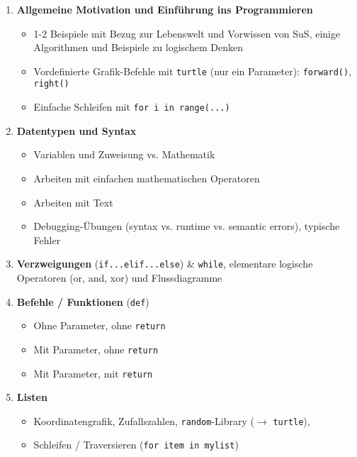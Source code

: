 \begin{overviewBox}[title=Überblick der Themen]
    \begin{enumerate}
    \item \textbf{Allgemeine Motivation und Einführung ins Programmieren}
    \begin{itemize}
        \item 1-2 Beispiele mit Bezug zur Lebenswelt und Vorwissen von SuS, einige Algorithmen und Beispiele zu logischem Denken
        \item Vordefinierte Grafik-Befehle mit \lstinline|turtle| (nur ein Parameter): \lstinline|forward()|, \lstinline|right()|
        \item Einfache Schleifen mit \lstinline|for i in range(...)|
    \end{itemize}
    \item \textbf{Datentypen und Syntax}
    \begin{itemize}
        \item Variablen und Zuweisung vs. Mathematik
        \item Arbeiten mit einfachen mathematischen Operatoren
        \item Arbeiten mit Text
        \item Debugging-Übungen (syntax vs. runtime vs. semantic errors), typische Fehler
    \end{itemize}
    \item \textbf{Verzweigungen} (\lstinline|if...elif...else|) \& \lstinline|while|,  elementare logische Operatoren (or, and, xor)  und Flussdiagramme
    \item \textbf{Befehle / Funktionen} (\lstinline|def|)
    \begin{itemize}
        \item Ohne Parameter, ohne \lstinline|return|
        \item Mit Parameter, ohne \lstinline|return|
        \item Mit Parameter, mit \lstinline|return|
    \end{itemize}
    \item \textbf{Listen}
    \begin{itemize}
        \item  Koordinatengrafik, Zufallszahlen, \lstinline|random|-Library ($\rightarrow$ \lstinline|turtle|), \item Schleifen / Traversieren (\lstinline|for item in mylist|)
    \end{itemize}
\end{enumerate}
\end{overviewBox}

